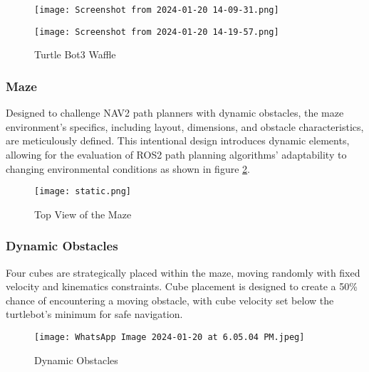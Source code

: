 \documentclass[sigconf]{acmart}
\begin{document}
\begin{figure}[H]
  \begin{minipage}{0.23\textwidth}
    \centering
    \texttt{[image: Screenshot from 2024-01-20 14-09-31.png]}
    
    \label{fig:image1}
  \end{minipage}%
  \begin{minipage}{0.25\textwidth}
    \centering
    \texttt{[image: Screenshot from 2024-01-20 14-19-57.png]}
    
    \label{fig:image2}
  \end{minipage}
  \caption{Turtle Bot3 Waffle}
  \label{fig:turtlebot3}
\end{figure}

\subsubsection{Maze}
Designed to challenge NAV2 path planners with dynamic obstacles, the maze environment's specifics, including layout, dimensions, and obstacle characteristics, are meticulously defined. This intentional design introduces dynamic elements, allowing for the evaluation of ROS2 path planning algorithms' adaptability to changing environmental conditions as shown in figure \ref{fig:maze}.
\begin{figure}[H]
  \centering
  \texttt{[image: static.png]} %
  \caption{Top View of the Maze}
  \label{fig:maze}
\end{figure}

\subsubsection{Dynamic Obstacles}
Four cubes are strategically placed within the maze, moving randomly with fixed velocity and kinematics constraints. Cube placement is designed to create a 50\% chance of encountering a moving obstacle, with cube velocity set below the turtlebot's minimum for safe navigation.
\begin{figure}[H]
  \centering
  \texttt{[image: WhatsApp Image 2024-01-20 at 6.05.04 PM.jpeg]} %
  \caption{Dynamic Obstacles}
  \label{fig:dynamic obstacles}
\end{figure}
\end{document}
